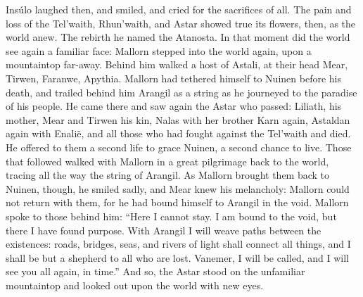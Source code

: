 \documentclass[smalldemyvopaper,11pt,twoside,onecolumn,openright,extrafontsizes]{memoir}
\begin{document}
	Insúlo laughed then, and smiled, and cried for the sacrifices of all. The pain and loss of the Tel’waith, Rhun’waith, and Astar showed true its flowers, then, as the world anew. The rebirth he named the Atanosta. In that moment did the world see again a familiar face: Mallorn stepped into the world again, upon a mountaintop far-away. Behind him walked a host of Astali, at their head Mear, Tirwen, Faranwe, Apythia. Mallorn had tethered himself to Nuinen before his death, and trailed behind him Arangil as a string as he journeyed to the paradise of his people. He came there and saw again the Astar who passed: Liliath, his mother, Mear and Tirwen his kin, Nalas with her brother Karn again, Astaldan again with Enalië, and all those who had fought against the Tel’waith and died. He offered to them a second life to grace Nuinen, a second chance to live. Those that followed walked with Mallorn in a great pilgrimage back to the world, tracing all the way the string of Arangil. As Mallorn brought them back to Nuinen, though, he smiled sadly, and Mear knew his melancholy: Mallorn could not return with them, for he had bound himself to Arangil in the void. Mallorn spoke to those behind him:
“Here I cannot stay. I am bound to the void, but there I have found purpose. With Arangil I will weave paths between the existences: roads, bridges, seas, and rivers of light shall connect all things, and I shall be but a shepherd to all who are lost. Vanemer, I will be called, and I will see you all again, in time.”
And so, the Astar stood on the unfamiliar mountaintop and looked out upon the world with new eyes.
\end{document}
